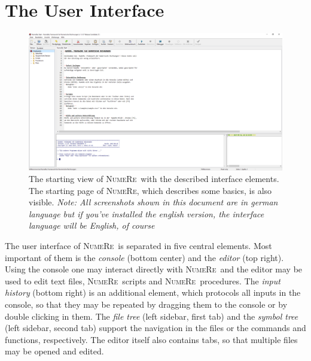 \documentclass[DIV=14,headsepline,footsepline]{scrbook}
\newcommand{\NR}{\textsc{Nu\-me\-Re}}
\begin{document}
			\section{The User Interface}
				\begin{figure}[htb]%
					\centering
					\includegraphics[width=\textwidth]{_graphics/ui.png}
					\caption{The starting view of \NR\ with the described interface elements. The starting page of \NR, which describes some basics, is also visible. \emph{Note: All screenshots shown in this document are in german language but if you've installed the english version, the interface language will be English, of course}}
					\label{fig:ui}
				\end{figure}
				The user interface of \NR\ is separated in five central elements. Most important of them is the \emph{console} (bottom center) and the \emph{editor} (top right). Using the console one may interact directly with \NR\ and the editor may be used to edit text files, \NR\ scripts and \NR\ procedures. The \emph{input history} (bottom right) is an additional element, which protocols all inputs in the console, so that they may be repeated by dragging them to the console or by double clicking in them. The \emph{file tree} (left sidebar, first tab) and the \emph{symbol tree} (left sidebar, second tab) support the navigation in the files or the commands and functions, respectively. The editor itself also contains tabs, so that multiple files may be opened and edited.
				
\end{document}
